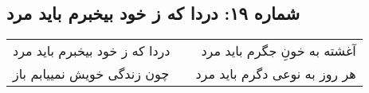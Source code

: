 \begin{center}
\section*{شماره ۱۹: دردا که ز خود بیخبرم باید مرد}
\label{sec:019}
\begin{longtable}{l p{0.5cm} r}
دردا که ز خود بیخبرم باید مرد
&&
آغشته به خونِ جگرم باید مرد
\\
چون زندگی خویش نمییابم باز
&&
هر روز به نوعی دگرم باید مرد
\\
\end{longtable}
\end{center}
